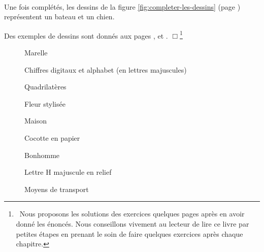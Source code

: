 \clearpage
\begin{corriges}{\ \\

\vspace{-\baselineskip}
\tiret Une fois complétés, les dessins de la figure 
\ref{fig:completer-les-dessins} (page \pageref{fig:completer-les-dessins}) 
re\-pré\-sen\-tent un bateau et un chien.

\tiret  Des exemples de dessins
sont donnés aux pages \pageref{fig:marelle}, \pageref{fig:quadrilateres} et
\pageref{fig:transports}.
$\Box$\footnote{\ Nous proposons les solutions des exercices quelques pages 
après en avoir donné les énon\-cés.
Nous conseillons vivement au lecteur de lire ce livre par petites étapes
en prenant le soin de faire quelques exercices après chaque chapitre.}
}\end{corriges}
\begin{figure}[htbp]
 \caption{Marelle}
 \label{fig:marelle}
\end{figure}
\vfill
\begin{figure}[htbp]
 \caption{Chiffres digitaux et alphabet (en lettres majuscules)}
 \label{fig:alphabet}
\end{figure}
\vfill
\twocolumn
\begin{figure}[h]
 \caption{Quadrilatères}\label{fig:quadrilateres}
\end{figure}
\begin{figure}[h]
 \caption{Fleur stylisée}
\end{figure}
\vfill
\begin{figure}[h]
 \caption{Maison}
\end{figure}
\vfil
\begin{figure}[h]
 \caption{Cocotte en papier}
\end{figure}
\vfil
\begin{figure}[h]
 \caption{Bonhomme}
\end{figure}
\vfil
\begin{figure}[h]
 \caption{Lettre H majuscule en relief}
 \label{fig:h-relief}
\end{figure}
\onecolumn
\begin{figure}[h]
 \caption{Moyens de transport}\label{fig:transports}
\end{figure}

